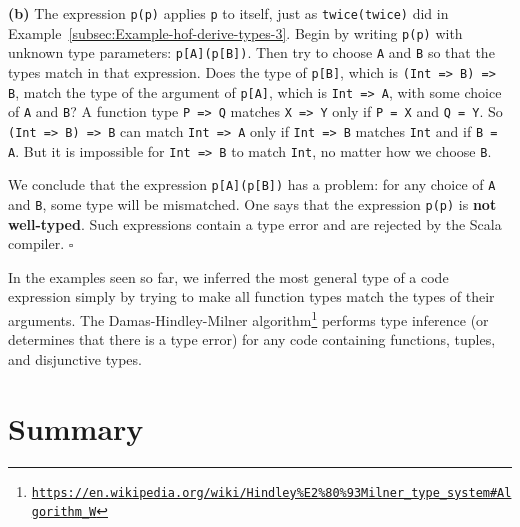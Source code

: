 \textbf{(b)} The expression \lstinline!p(p)! applies \lstinline!p!
to itself, just as \lstinline!twice(twice)! did in Example~\ref{subsec:Example-hof-derive-types-3}.
Begin by writing \lstinline!p(p)! with unknown type parameters: \lstinline!p[A](p[B])!.
Then  try to choose \lstinline!A! and \lstinline!B! so that the
types match in that expression. Does the type of \lstinline!p[B]!,
which is \lstinline!(Int => B) => B!, match the type of the argument
of \lstinline!p[A]!, which is \lstinline!Int => A!, with some choice
of \lstinline!A! and \lstinline!B!? A function type \lstinline!P => Q!
matches \lstinline!X => Y! only if \lstinline!P = X! and \lstinline!Q = Y!.
So \lstinline!(Int => B) => B! can match \lstinline!Int => A! only
if \lstinline!Int => B! matches \lstinline!Int! and if \lstinline!B = A!.
But it is impossible for \lstinline!Int => B! to match \lstinline!Int!,
no matter how we choose \lstinline!B!. 

We conclude that the expression \lstinline!p[A](p[B])! has a problem:
for any choice of \lstinline!A! and \lstinline!B!, some type will
be mismatched. One says that the expression \lstinline!p(p)! is \textbf{not
well-typed}. Such expressions contain
a type error and are rejected by the Scala compiler. $\square$

In the examples seen so far, we inferred the most general type of
a code expression simply by trying to make all function types match
the types of their arguments. The Damas-Hindley-Milner algorithm\footnote{\texttt{\href{https://en.wikipedia.org/wiki/Hindley\%E2\%80\%93Milner_type_system\#Algorithm_W}{https://en.wikipedia.org/wiki/Hindley\%E2\%80\%93Milner\_type\_system\#Algorithm\_W}}}
performs type inference (or determines that
there is a type error) for any code containing functions, tuples,
and disjunctive types.

\section{Summary}

